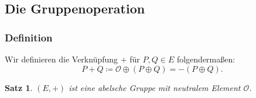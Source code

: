 \documentclass{beamer}
\theoremstyle{plain}
\newtheorem{thm}{Satz}[section]
\theoremstyle{definition}
\theoremstyle{rem}
\newcommand{\patinf}{\mathcal{O}}
\begin{document}
\subsection{Die Gruppenoperation}

\begin{frame}
    \frametitle{Definition}
    Wir definieren die Verknüpfung $+$ für $P, Q \in E$ folgendermaßen:
    \begin{equation*} \label{plus-op}
        P + Q \coloneqq \patinf \oplus (P \oplus Q) = -(P \oplus Q).
    \end{equation*}
    \begin{thm}
        $(E, +)$ ist eine abelsche Gruppe mit neutralem Element $\patinf$.
    \end{thm}
\end{frame}

\end{document}
